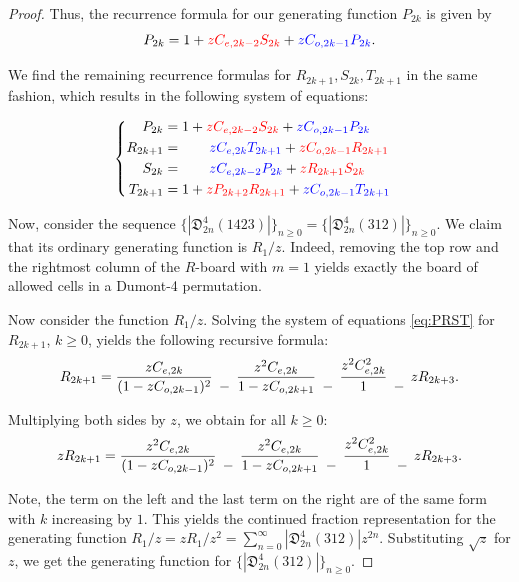 \documentclass[
final
]{dmtcs-episciences}
\theoremstyle{definition}
\theoremstyle{remark}
\begin{document}
\begin{proof}
Thus, the recurrence formula for our generating function $P_{2k}$ is given by 
\[
P_{2k} = 1 + {\color{red}z C_{e,2k-2} S_{2k}} + {\color{blue}z C_{o,2k-1}P_{2k}}.
\]


We find the remaining recurrence formulas for $R_{2k+1}, S_{2k}, T_{2k+1}$ in the same fashion, which results in the following system of equations:

\begin{equation} \label{eq:PRST}
\begin{cases}
\begin{aligned}
P_{2k} &= 1 + {\color{red}z C_{e,2k-2} S_{2k}} + {\color{blue}z C_{o,2k-1}P_{2k}}\\
R_{2k+1} &= \phantom{1+\ \ } {\color{blue}z C_{e,2k} T_{2k+1}} + {\color{red}z C_{o,2k-1} R_{2k+1}}\\
S_{2k} &= \phantom{1+\ \ } {\color{blue}z C_{e,2k-2} P_{2k}} + {\color{red}z R_{2k+1} S_{2k}}\\
T_{2k+1} &= 1 + {\color{red}z  P_{2k+2} R_{2k+1}} + {\color{blue}z C_{o,2k-1} T_{2k+1}}
\end{aligned}
\end{cases}
\end{equation}


Now, consider the sequence $\{|\mathfrak{D}^4_{2n}(1423)|\}_{n\ge 0}=\{|\mathfrak{D}^4_{2n}(312)|\}_{n\ge 0}$. We claim that its ordinary generating function is $R_1/z$. Indeed, removing the top row and the rightmost column of the $R$-board with $m=1$ yields exactly the board of allowed cells in a Dumont-4 permutation.

Now consider the function $R_1/z$. Solving the system of equations \eqref{eq:PRST}  for $R_{2k+1}$, $k\ge 0$, yields the following recursive formula:
\[
R_{2k+1} = \frac{zC_{e,2k}}{(1-zC_{o,2k-1})^2} \,\,
 \genfrac{}{}{0pt}{}{}{-} \,\,
\frac{z^2C_{e,2k}}{1-zC_{o,2k+1}} \,\,
 \genfrac{}{}{0pt}{}{}{-} \,\,
\frac{z^2C_{e,2k}^2}{1} \,\,
 \genfrac{}{}{0pt}{}{}{-} \,\, 
zR_{2k+3}.
\]

Multiplying both sides by $z$, we obtain for all $k\ge 0$:
\[
zR_{2k+1} = \frac{z^2C_{e,2k}}{(1-zC_{o,2k-1})^2} \,\,
 \genfrac{}{}{0pt}{}{}{-} \,\,
\frac{z^2C_{e,2k}}{1-zC_{o,2k+1}} \,\,
 \genfrac{}{}{0pt}{}{}{-} \,\,
\frac{z^2C_{e,2k}^2}{1} \,\,
 \genfrac{}{}{0pt}{}{}{-} \,\, 
zR_{2k+3}.
\]

Note, the term on the left and the last term on the right are of the same form with $k$ increasing by $1$. This yields the continued fraction representation for the generating function $R_1/z=zR_1/z^2=\sum_{n=0}^{\infty}{|\mathfrak{D}^4_{2n}(312)|z^{2n}}$. Substituting $\sqrt{z}$ for $z$, we get the generating function for $\{|\mathfrak{D}^4_{2n}(312)|\}_{n\ge 0}$.
\end{proof}
\end{document}
